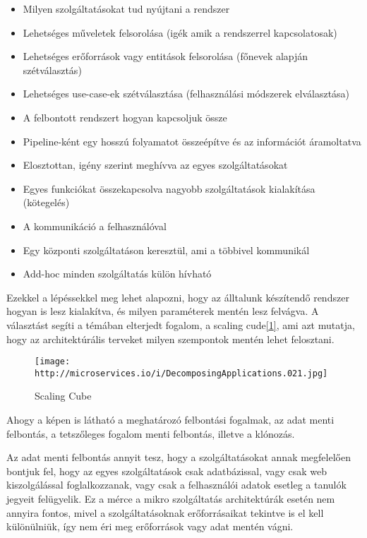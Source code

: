 \documentclass[11pt,magyar,a4paper,oneside,]{report}
\providecommand{\tightlist}{%
  \setlength{\itemsep}{0pt}\setlength{\parskip}{0pt}}
\let\Oldincludegraphics\includegraphics
\renewcommand{\includegraphics}[1]{
\begin{adjustbox}{max size={\textwidth}{\textheight}}
    \Oldincludegraphics[scale=0.6]{#1}%
\end{adjustbox}
}
\begin{document}
\begin{itemize}
\tightlist
\item
  Milyen szolgáltatásokat tud nyújtani a rendszer
\item
  Lehetséges műveletek felsorolása (igék amik a rendszerrel
  kapcsolatosak)
\item
  Lehetséges erőforrások vagy entitások felsorolása (főnevek alapján
  szétválasztás)
\item
  Lehetséges use-case-ek szétválasztása (felhasználási módszerek
  elválasztása)
\item
  A felbontott rendszert hogyan kapcsoljuk össze
\item
  Pipeline-ként egy hosszú folyamatot összeépítve és az információt
  áramoltatva
\item
  Elosztottan, igény szerint meghívva az egyes szolgáltatásokat
\item
  Egyes funkciókat összekapcsolva nagyobb szolgáltatások kialakítása
  (kötegelés)
\item
  A kommunikáció a felhasználóval
\item
  Egy központi szolgáltatáson keresztül, ami a többivel kommunikál
\item
  Add-hoc minden szolgáltatás külön hívható
\end{itemize}

Ezekkel a lépéssekkel meg lehet alapozni, hogy az álltalunk készítendő
rendszer hogyan is lesz kialakítva, és milyen paraméterek mentén lesz
felvágva. A választást segíti a témában elterjedt fogalom, a scaling
cude\href{http://microservices.io/articles/scalecube.html}{{[}1{]}}, ami
azt mutatja, hogy az architektúrális terveket milyen szempontok mentén
lehet felosztani.

\begin{figure}[htbp]
\centering
\texttt{[image: http://microservices.io/i/DecomposingApplications.021.jpg]}
\caption{Scaling Cube}
\end{figure}

Ahogy a képen is látható a meghatározó felbontási fogalmak, az adat
menti felbontás, a tetszőleges fogalom menti felbontás, illetve a
klónozás.

Az adat menti felbontás annyit tesz, hogy a szolgáltatásokat annak
megfelelően bontjuk fel, hogy az egyes szolgáltatások csak adatbázissal,
vagy csak web kiszolgálással foglalkozzanak, vagy csak a felhasználói
adatok esetleg a tanulók jegyeit felügyelik. Ez a mérce a mikro
szolgáltatás architektúrák esetén nem annyira fontos, mivel a
szolgáltatásoknak erőforrásaikat tekintve is el kell különülniük, így
nem éri meg erőforrások vagy adat mentén vágni.
\end{document}
